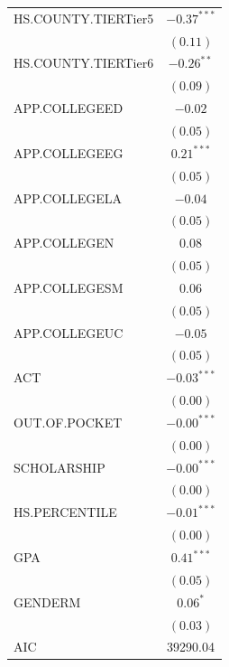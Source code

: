 \documentclass[12pt,english]{report}
\begin{document}
\begin{table}
\begin{center}
\begin{minipage}{0.4\textwidth}
{\begin{tabular}  {l c }
HS.COUNTY.TIERTier5             & $-0.37^{***}$ \\
                                & $(0.11)$      \\                      
HS.COUNTY.TIERTier6             & $-0.26^{**}$  \\
                                & $(0.09)$      \\
APP.COLLEGEED                   & $-0.02$       \\
                                & $(0.05)$      \\
APP.COLLEGEEG                   & $0.21^{***}$  \\
                                & $(0.05)$      \\
APP.COLLEGELA                   & $-0.04$       \\
                                & $(0.05)$      \\
APP.COLLEGEN                    & $0.08$        \\
                                & $(0.05)$      \\
APP.COLLEGESM                   & $0.06$        \\
                                & $(0.05)$      \\
APP.COLLEGEUC                   & $-0.05$       \\
                                & $(0.05)$      \\
ACT                             & $-0.03^{***}$ \\
                                & $(0.00)$      \\
OUT.OF.POCKET                   & $-0.00^{***}$ \\
                                & $(0.00)$      \\
SCHOLARSHIP                     & $-0.00^{***}$ \\
                                & $(0.00)$      \\
HS.PERCENTILE                   & $-0.01^{***}$ \\
                                & $(0.00)$      \\
GPA                             & $0.41^{***}$  \\
                                & $(0.05)$      \\
GENDERM                         & $0.06^{*}$    \\
                                & $(0.03)$      \\
\hline
AIC                             & 39290.04      \\

\end{tabular}}
\end{minipage}
\end{center}
\end{table}
\end{document}
